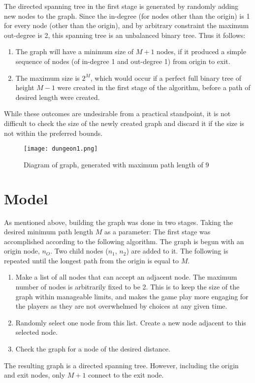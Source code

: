 \documentclass[landscape, a0, final]{a0poster}
\begin{document}
\begin{minipage}[c]{0.49\linewidth}
\begin{minipage}{0.45\linewidth}
The directed spanning tree in the first stage is generated by randomly adding new nodes to the graph.  Since the in-degree (for nodes other than the origin) is 1 for every node (other than the origin), and by arbitrary constraint the maximum out-degree is 2, this spanning tree is an unbalanced binary tree.  Thus it follows: 
    \begin{enumerate} 
        \item The graph will have a minimum size of $M + 1$ nodes, if it produced a simple sequence of nodes (of in-degree 1 and out-degree 1) from origin to exit.  
        \item The maximum size is $2^{M}$, which would occur if a perfect full binary tree of height $M - 1$ were created in the first stage of the algorithm, before a path of desired length were created.  
    \end{enumerate} 
While these outcomes are undesirable from a practical standpoint, it is not difficult to check the size of the newly created graph and discard it if the size is not within the preferred bounds.

\centering 
        \begin{figure}[H]
            \texttt{[image: dungeon1.png]} 
            \caption{Diagram of graph, generated with maximum path length of 9} 
            \label{graph8}
        \end{figure}

\end{minipage} 
    \begin{minipage}[c]{0.45\linewidth}

\section{Model}

As mentioned above, building the graph was done in two stages.  Taking the desired minimum path length $M$ as a parameter: 
The first stage was accomplished according to the following algorithm.  The graph is begun with an origin node, $n_O$.  Two child nodes ($n_1$, $n_2$) are added to it.  The following is repeated until the longest path from the origin is equal to $M$. 
\begin{enumerate} 
    \item Make a list of all nodes that can accept an adjacent node.  The maximum number of nodes is arbitrarily fixed to be 2.  This is to keep the size of the graph within manageable limits, and makes the game play more engaging for the players as they are not overwhelmed by choices at any given time. 
    \item Randomly select one node from this list.  Create a new node adjacent to this selected node.
    \item Check the graph for a node of the desired distance.
\end{enumerate} 
The resulting graph is a directed spanning tree.  However, including the origin and exit nodes, only $M + 1$ connect to the exit node.


\end{minipage}
\end{minipage}
\end{document}
